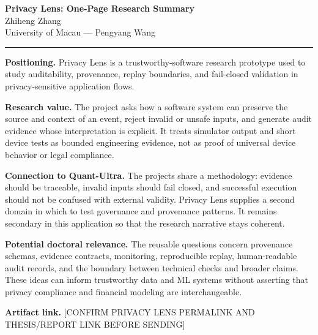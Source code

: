 \documentclass[11pt]{article}
\newcommand{\ApplicantName}{Zhiheng Zhang}
\begin{document}
\begin{center}
{\LARGE\bfseries Privacy Lens: One-Page Research Summary}\\[0.25em]
{\large \ApplicantName}\\
University of Macau --- Pengyang Wang
\end{center}
\vspace{0.35em}\hrule\vspace{0.65em}

\textbf{Positioning.} Privacy Lens is a trustworthy-software research prototype used to study auditability, provenance, replay boundaries, and fail-closed validation in privacy-sensitive application flows.

\textbf{Research value.} The project asks how a software system can preserve the source and context of an event, reject invalid or unsafe inputs, and generate audit evidence whose interpretation is explicit. It treats simulator output and short device tests as bounded engineering evidence, not as proof of universal device behavior or legal compliance.

\textbf{Connection to Quant-Ultra.} The projects share a methodology: evidence should be traceable, invalid inputs should fail closed, and successful execution should not be confused with external validity. Privacy Lens supplies a second domain in which to test governance and provenance patterns. It remains secondary in this application so that the research narrative stays coherent.

\textbf{Potential doctoral relevance.} The reusable questions concern provenance schemas, evidence contracts, monitoring, reproducible replay, human-readable audit records, and the boundary between technical checks and broader claims. These ideas can inform trustworthy data and ML systems without asserting that privacy compliance and financial modeling are interchangeable.

\textbf{Artifact link.} [CONFIRM PRIVACY LENS PERMALINK AND THESIS/REPORT LINK BEFORE SENDING]
\end{document}
